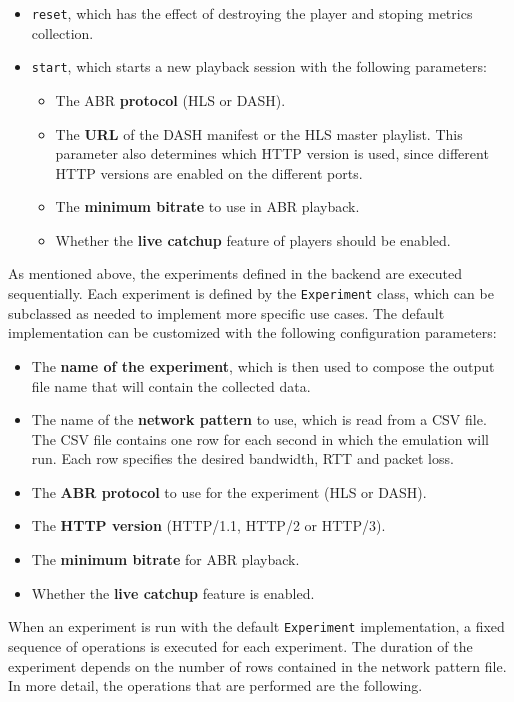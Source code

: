 \begin{itemize}
    \item \texttt{reset}, which has the effect of destroying the player and stoping metrics collection.
    \item \texttt{start}, which starts a new playback session with the following parameters:
    \begin{itemize}
        \item The ABR \textbf{protocol} (HLS or DASH).
        \item The \textbf{URL} of the DASH manifest or the HLS master playlist. This parameter also determines which HTTP version is used, since different HTTP versions are enabled on the different ports.
        \item The \textbf{minimum bitrate} to use in ABR playback.
        \item Whether the \textbf{live catchup} feature of players should be enabled.
    \end{itemize}
\end{itemize}

As mentioned above, the experiments defined in the backend are executed sequentially. Each experiment is defined by the \texttt{Experiment} class, which can be subclassed as needed to implement more specific use cases. The default implementation can be customized with the following configuration parameters:

\begin{itemize}
    \item The \textbf{name of the experiment}, which is then used to compose the output file name that will contain the collected data.
    \item The name of the \textbf{network pattern} to use, which is read from a CSV file. The CSV file contains one row for each second in which the emulation will run. Each row specifies the desired bandwidth, RTT and packet loss.
    \item The \textbf{ABR protocol} to use for the experiment (HLS or DASH).
    \item The \textbf{HTTP version} (HTTP/1.1, HTTP/2 or HTTP/3).
    \item The \textbf{minimum bitrate} for ABR playback.
    \item Whether the \textbf{live catchup} feature is enabled.
\end{itemize}

When an experiment is run with the default \texttt{Experiment} implementation, a fixed sequence of operations is executed for each experiment. The duration of the experiment depends on the number of rows contained in the network pattern file. In more detail, the operations that are performed are the following.

